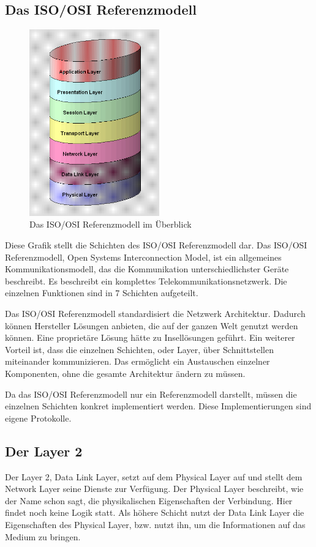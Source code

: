 \documentclass[12pt, a4paper, ngerman]{article}
\newcommand{\osi}{ISO/OSI Referenzmodell\xspace}
\begin{document}
\subsection{Das \osi}
\begin{figure}[h]
\includegraphics[width=0.5\textwidth]{Grafiken/osi_modell.jpg}
\caption{Das \osi im Überblick \cite{osi_modell}}
\label{osi_modell}
\end{figure} 
Diese Grafik stellt die Schichten des \osi dar. Das \osi, Open Systems Interconnection Model, ist ein allgemeines Kommunikationsmodell,  das die Kommunikation unterschiedlichster Geräte beschreibt. Es beschreibt ein komplettes Telekommunikationsnetzwerk. Die einzelnen Funktionen sind in 7 Schichten aufgeteilt. 

Das \osi standardisiert die Netzwerk Architektur. Dadurch können Hersteller Lösungen anbieten, die auf der ganzen Welt genutzt werden können. Eine proprietäre Lösung hätte zu Insellösungen geführt. Ein weiterer Vorteil ist, dass die einzelnen Schichten, oder Layer, über Schnittstellen miteinander kommunizieren. Das ermöglicht ein Austauschen einzelner Komponenten, ohne die gesamte Architektur ändern zu müssen.

Da das \osi nur ein Referenzmodell darstellt, müssen die einzelnen Schichten konkret implementiert werden. Diese Implementierungen sind eigene Protokolle. 

\subsection{Der Layer 2}
Der Layer 2, Data Link Layer, setzt auf dem Physical Layer auf und stellt dem Network Layer seine Dienste zur Verfügung. Der Physical Layer beschreibt, wie der Name schon sagt, die physikalischen Eigenschaften der Verbindung.  Hier findet noch keine Logik statt. Als höhere Schicht nutzt der Data Link Layer die Eigenschaften des Physical Layer, bzw. nutzt ihn, um die Informationen auf das Medium zu bringen.
\end{document}
